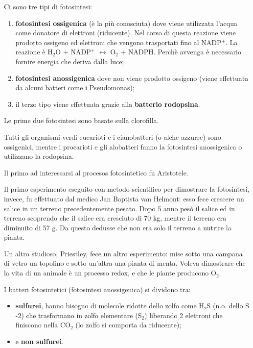 \documentclass[]{article}
\begin{document}
Ci sono tre tipi di fotosintesi:

\begin{enumerate}
\def\labelenumi{\arabic{enumi}.}
\itemsep1pt\parskip0pt
\item
  \textbf{fotosintesi ossigenica} (è la più conosciuta) dove viene
  utilizzata l'acqua come donatore di elettroni (riducente). Nel corso
  di questa reazione viene prodotto ossigeno ed elettroni che vengono
  trasportati fino al NADP$^+$. La reazione è H$_2$O + NADP$^+$
  $\leftrightarrow$ O$_2$ + NADPH. Perchè avvenga è necessario fornire
  energia che deriva dalla luce;
\item
  \textbf{fotosintesi anossigenica} dove non viene prodotto ossigeno
  (viene effettuata da alcuni batteri come i Pseudomonas);
\item
  il terzo tipo viene effettuata grazie alla \textbf{batterio
  rodopsina}.
\end{enumerate}

Le prime due fotosintesi sono basate sulla clorofilla.

Tutti gli organismi verdi eucarioti e i cianobatteri (o alche azzurre)
sono ossigenici, mentre i procarioti e gli alobatteri fanno la
fotosintesi anossigenica o utilizzano la rodopsina.

Il primo ad interessarsi al procesos fotosintetico fu Aristotele.

Il primo esperimento eseguito con metodo scientifico per dimostrare la
fotosintesi, invece, fu effettuato dal medico Jan Baptista van Helmont:
esso fece crescere un salice in un terreno precedentemente pesato. Dopo
5 anno pesò il salice ed in terreno scoprendo che il salice era
cresciuto di 70 kg, mentre il terreno era diminuito di 57 g. Da questo
dedusse che non era solo il terreno a nutrire la pianta.

Un altro studioso, Priestley, fece un altro esperimento: mise sotto una
campana di vetro un topolino e sotto un'altra una pianta di menta.
Voleva dimostrare che la vita di un animale è un processo redox, e che
le piante producono O$_2$.

I batteri fotosintetici (fotosintesi anossigenica) si dividono tra:

\begin{itemize}
\itemsep1pt\parskip0pt
\item
  \textbf{sulfurei}, hanno bisogno di molecole ridotte dello zolfo come
  H$_2$S (n.o. dello S -2) che trasformano in zolfo elementare (S$_2$)
  liberando 2 elettroni che finiscono nella CO$_2$ (lo zolfo si comporta
  da riducente);
\item
  e \textbf{non sulfurei}.
\end{itemize}
\end{document}
